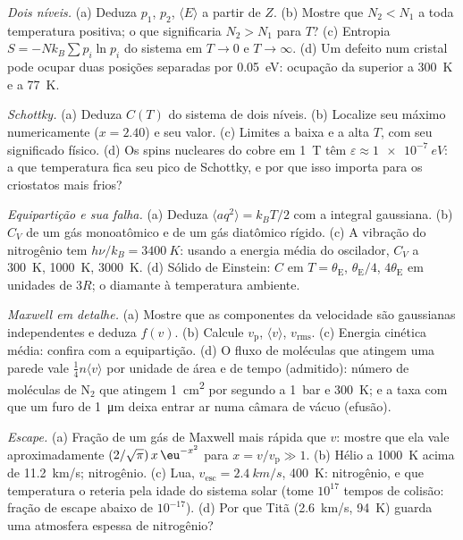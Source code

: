 \begin{exercise}[$\star\star$]\label{exo:b2:boltzmann-factor:5}
\emph{Dois níveis.} (a) Deduza $p_1$, $p_2$, $\langle E\rangle$ a partir de $Z$. (b)
Mostre que $N_2 < N_1$ a toda temperatura positiva; o que significaria $N_2 >
N_1$ para $T$? (c) Entropia $S = -Nk_B\sum p_i\ln p_i$ do sistema em
$T \to 0$ e $T \to \infty$. (d) Um defeito num cristal pode ocupar duas
posições separadas por \qty{0.05}{eV}: ocupação da superior a
\qty{300}{K} e a \qty{77}{K}.
\end{exercise}

\begin{exercise}[$\star\star$]\label{exo:b2:boltzmann-factor:6}
\emph{Schottky.} (a) Deduza $C(T)$ do sistema de dois níveis. (b) Localize
seu máximo numericamente ($x = 2.40$) e seu valor. (c) Limites a baixa
e a alta $T$, com seu significado físico. (d) Os spins nucleares do cobre
em \qty{1}{T} têm $\varepsilon \approx \qty{1e-7}{eV}$: a que temperatura fica
seu pico de Schottky, e por que isso importa para os criostatos
mais frios?
\end{exercise}

\begin{exercise}[$\star\star$]\label{exo:b2:boltzmann-factor:7}
\emph{Equipartição e sua falha.} (a) Deduza $\langle aq^2\rangle =
k_BT/2$ com a integral gaussiana. (b) $C_V$ de um gás monoatômico e de um
gás diatômico rígido. (c) A vibração do nitrogênio tem $h\nu/k_B = \qty{3400}{K}$:
usando a energia média do oscilador, $C_V$ a \qty{300}{K}, \qty{1000}{K},
\qty{3000}{K}. (d) Sólido de Einstein: $C$ em $T = \theta_{\text{E}}$, $\theta_{\text{E}}/4$,
$4\theta_{\text{E}}$ em unidades de $3R$; o diamante à temperatura ambiente.
\end{exercise}

\begin{exercise}[$\star\star$]\label{exo:b2:boltzmann-factor:8}
\emph{Maxwell em detalhe.} (a) Mostre que as componentes da velocidade são
gaussianas independentes e deduza $f(v)$. (b) Calcule $v_{\text{p}}$,
$\langle v\rangle$, $v_{\text{rms}}$. (c) Energia cinética média: confira com a
equipartição. (d) O fluxo de moléculas que atingem uma parede vale
$\tfrac14n\langle v\rangle$ por unidade de área e de tempo (admitido): número de
moléculas de N$_2$ que atingem \qty{1}{cm^2} por segundo a \qty{1}{bar} e
\qty{300}{K}; e a taxa com que um furo de \qty{1}{\micro m} deixa entrar ar
numa câmara de vácuo (efusão).
\end{exercise}

\begin{exercise}[$\star\star$]\label{exo:b2:boltzmann-factor:9}
\emph{Escape.} (a) Fração de um gás de Maxwell mais rápida que $v$: mostre que ela
vale aproximadamente $(2/\sqrt\pi)\,x\,\eu^{-x^2}$ para $x = v/v_{\text{p}} \gg 1$.
(b) Hélio a \qty{1000}{K} acima de \qty{11.2}{km/s}; nitrogênio. (c) Lua,
$v_{\text{esc}} = \qty{2.4}{km/s}$, \qty{400}{K}: nitrogênio, e que
temperatura o reteria pela idade do sistema solar (tome $10^{17}$
tempos de colisão: fração de escape abaixo de $10^{-17}$). (d) Por que Titã
(\qty{2.6}{km/s}, \qty{94}{K}) guarda uma atmosfera espessa de nitrogênio?
\end{exercise}

